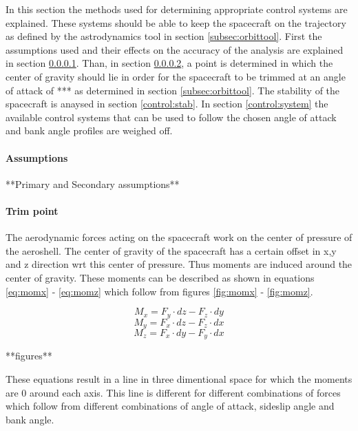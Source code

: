 In this section the methods used for determining appropriate control systems are explained. These systems should be able to keep the spacecraft on the trajectory as defined by the astrodynamics tool in section \ref{subsec:orbittool}. First the assumptions used and their effects on the accuracy of the analysis are explained in section \ref{control:assumptions}. Than, in section \ref{control:trim}, a point is determined in which the center of gravity should lie in order for the spacecraft to be trimmed at an angle of attack of *** as determined in section  \ref{subsec:orbittool}. The stability of the spacecraft is anaysed in section \ref{control:stab}. In section \ref{control:system} the available control systems that can be used to follow the chosen angle of attack and bank angle profiles are weighed off.

\paragraph{Assumptions}
\label{control:assumptions}
**Primary and Secondary assumptions**

\paragraph{Trim point}
\label{control:trim}
The aerodynamic forces acting on the spacecraft work on the center of pressure of the aeroshell. The center of gravity of the spacecraft has a certain offset in x,y and z direction wrt this center of pressure. Thus moments are induced around the center of gravity. These moments can be described as shown in equations \ref{eq:momx} - \ref{eq:momz} which follow from figures \ref{fig:momx} - \ref{fig:momz}.

\begin{equation}
\label{eq:momx}
M_x = F_y \cdot dz - F_z \cdot dy
\end{equation}
\begin{equation}
\label{eq:momy}
M_y = F_x \cdot dz - F_z \cdot dx
\end{equation}
\begin{equation}
\label{eq:momz}
M_z = F_x \cdot dy - F_y \cdot dx
\end{equation}

**figures**

These equations result in a line in three dimentional space for which the moments are 0 around each axis. This line is different for different combinations of forces which follow from different combinations of angle of attack, sideslip angle and bank angle.


